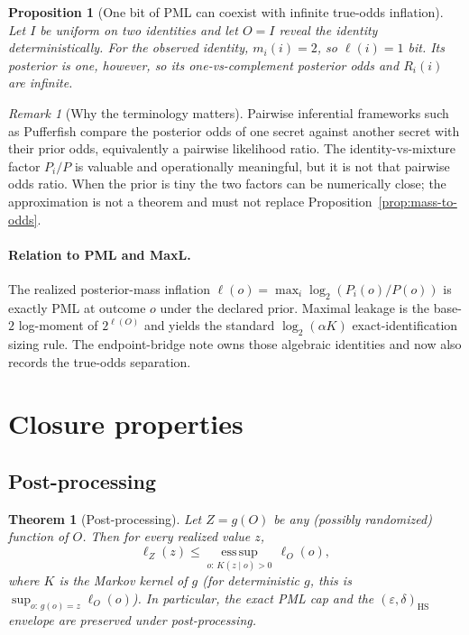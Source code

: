 \documentclass[11pt]{article}
\newtheorem{theorem}{Theorem}
\newtheorem{proposition}{Proposition}
\theoremstyle{definition}
\theoremstyle{remark}
\newtheorem{remark}{Remark}
\begin{document}
\begin{proposition}[One bit of PML can coexist with infinite true-odds inflation]\label{prop:deterministic-reveal}
Let $I$ be uniform on two identities and let $O=I$ reveal the identity deterministically.
For the observed identity, $m_i(i)=2$, so $\ell(i)=1$ bit.
Its posterior is one, however, so its one-vs-complement posterior odds and $R_i(i)$ are infinite.
\end{proposition}

\begin{remark}[Why the terminology matters]
Pairwise inferential frameworks such as Pufferfish compare the posterior odds of one secret against another secret with their prior odds, equivalently a pairwise likelihood ratio.
The identity-vs-mixture factor $P_i/P$ is valuable and operationally meaningful, but it is not that pairwise odds ratio.
When the prior is tiny the two factors can be numerically close; the approximation is not a theorem and must not replace Proposition~\ref{prop:mass-to-odds}.\cite{KiferMachanavajjhala2014Pufferfish}
\end{remark}

\paragraph{Relation to PML and MaxL.}
The realized posterior-mass inflation $\ell(o)=\max_i\log_2(P_i(o)/P(o))$ is exactly PML at outcome $o$ under the declared prior.
Maximal leakage is the base-$2$ log-moment of $2^{\ell(O)}$ and yields the standard $\log_2(\alpha K)$ exact-identification sizing rule.
The endpoint-bridge note owns those algebraic identities and now also records the true-odds separation.\cite{series:endpointbridge,series:bossfightA}

\section{Closure properties}
\subsection{Post-processing}
\begin{theorem}[Post-processing]\label{thm:postprocessing}
Let $Z=g(O)$ be any (possibly randomized) function of $O$.
Then for every realized value $z$,
\[
\ell_Z(z)\le \operatorname*{ess\,sup}_{o:\,K(z\mid o)>0}\,\ell_O(o),
\]
where $K$ is the Markov kernel of $g$ (for deterministic $g$, this is $\sup_{o:\,g(o)=z}\ell_O(o)$).
In particular, the exact PML cap and the $(\varepsilon,\delta)_{\mathrm{HS}}$ envelope are preserved under post-processing.
\end{theorem}
\end{document}
